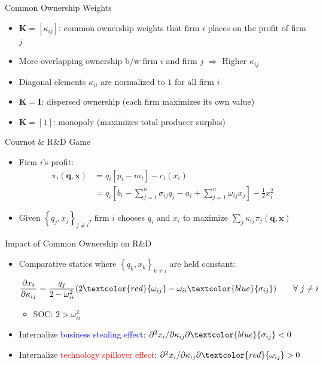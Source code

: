 \documentclass[english,aspectratio=169,handout]{beamer}
\theoremstyle{plain}
\newcommand{\mat}[1]{\bm{#1}}
\begin{document}
\begin{frame}{Common Ownership Weights}
  \label{ownership_weight}
  \begin{itemize}
    \item $\mat{K}=\left[\kappa_{ij}\right]$: common ownership weights that firm $i$ places on the profit of firm $j$
    \medskip{}
    \item More overlapping ownership b/w firm $i$ and firm $j$ $\Longrightarrow$ Higher $\kappa_{ij}$ \hfill\hyperlink{rotemberg}{}
    \medskip{}
    \item Diagonal elements $\kappa_{ii}$ are normalized to $1$ for all firm $i$
    \medskip{}
    \item $\mat{K}=\mat{I}$: dispersed ownership (each firm maximizes its own value)
    \medskip{}
    \item  $\mat{K}=[1]$: monopoly (maximizes total producer surplus)
  \end{itemize}
\end{frame}

\begin{frame}{Cournot \& R\&D Game}
  \begin{itemize}
    \item Firm $i$'s profit:
    \begin{align*}
      \pi_{i}(\mathbf{q}, \mathbf{x}) & = q_{i} [p_i - m_i] - c_i(x_i) \\
                                     & = q_{i} \left[ b_{i} - \sum_{j=1}^{n} \sigma_{ij} q_{j} - a_{i} + \sum_{j=1}^{n} \omega_{ij} x_{j} \right] - \frac{1}{2}x_{i}^{2}
  \end{align*}
    \item  Given $\left\{ q_{j}, x_{j}\right\} _{j\neq i}$,
    firm $i$ chooses $q_{i}$ and $x_{i}$ to maximize
    $\sum_{j}\kappa_{ij}\pi_{j}(\mathbf{q}, \mathbf{x}) $
  \end{itemize}
\end{frame}

\begin{frame}{Impact of Common Ownership on R\&D}
  \begin{itemize}
    \item Comparative statics where $\left\{ q_{k}, x_{k}\right\} _{k\neq i}$ are held constant:
          \[
            \frac{\partial x_{i}}{\partial\kappa_{ij}} = \frac{q_j}{2 - \omega_{ii}^2}( 2\textcolor{red}{\omega_{ij}} - \omega_{ii} \textcolor{blue}{\sigma_{ij}}) \quad\quad  \forall \ j \neq i
          \]
          \begin{itemize}
            \item SOC: $2>\omega_{ii}^2$
          \end{itemize}
          \medskip{}
    \item Internalize \textcolor{blue}{business stealing effect}: $\partial^2 x_{i}/\partial\kappa_{ij}\partial\textcolor{blue}{\sigma_{ij}}<0$
          \medskip{}
    \item Internalize \textcolor{red}{technology spillover effect}:  $\partial^2 x_{i}/\partial\kappa_{ij}\partial\textcolor{red}{\omega_{ij}}>0$
  \end{itemize}
\end{frame}
\end{document}
